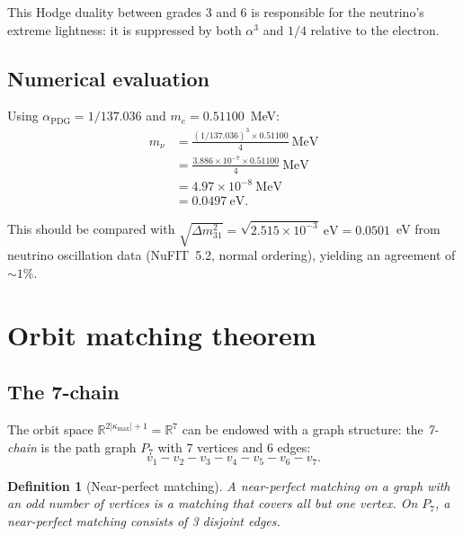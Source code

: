 \documentclass[11pt,letterpaper]{article}
\newtheorem{definition}[theorem]{Definition}
\numberwithin{equation}{section}
\begin{document}
This Hodge duality between grades 3 and 6 is responsible for the neutrino's
extreme lightness: it is suppressed by both $\alpha^3$ and $1/4$ relative
to the electron.

\subsection{Numerical evaluation}

Using $\alpha_\mathrm{PDG} = 1/137.036$ and $m_e = 0.51100$~MeV:
\begin{align}
  m_\nu &= \frac{(1/137.036)^3 \times 0.51100}{4}~\mathrm{MeV} \nonumber\\
  &= \frac{3.886 \times 10^{-7} \times 0.51100}{4}~\mathrm{MeV} \nonumber\\
  &= 4.97 \times 10^{-8}~\mathrm{MeV} \nonumber\\
  &= 0.0497~\mathrm{eV}. \label{eq:m_nu_num}
\end{align}

This should be compared with $\sqrt{\Delta m^2_{31}} = \sqrt{2.515 \times 10^{-3}}~\mathrm{eV} = 0.0501$~eV from neutrino oscillation data (NuFIT~5.2, normal ordering), yielding an agreement of $\sim 1\%$.

\section{Orbit matching theorem}
\label{sec:orbit_matching}

\subsection{The 7-chain}

The orbit space $\mathbb{R}^{2|\kappa_\mathrm{max}|+1} = \mathbb{R}^7$ can
be endowed with a graph structure: the \emph{7-chain} is the path graph
$P_7$ with 7 vertices and 6 edges:
\begin{equation}
  v_1 - v_2 - v_3 - v_4 - v_5 - v_6 - v_7.
\end{equation}

\begin{definition}[Near-perfect matching]
A \emph{near-perfect matching} on a graph with an odd number of vertices is
a matching that covers all but one vertex. On $P_7$, a near-perfect matching
consists of 3 disjoint edges.
\end{definition}
\end{document}
